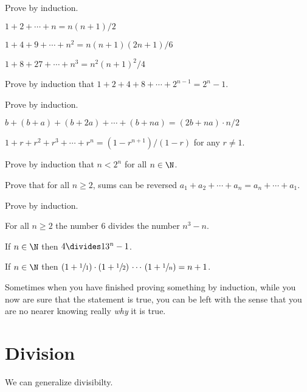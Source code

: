 \documentclass{ibl}
\begin{document}
\begin{ex}
Prove by induction.
\begin{exes}
\item $1+2+\cdots+n=n(n+1)/2$
\item $1+4+9+\cdots+n^2=n(n+1)(2n+1)/6$
\item $1+8+27+\cdots+n^3=n^2(n+1)^2/4$
\end{exes}
\end{ex}

\begin{ex}
Prove by induction that
$1+2+4+8+\cdots+2^{n-1}=2^n-1$.  
\end{ex}

\begin{ex}
Prove by induction.
\begin{exes}
  \item {}
       $b+(b+a)+(b+2a)+\cdots+(b+na)=(2b+na)\cdot n/2$
  \item {}
        $1+r+r^2+r^3+\cdots+r^n=(1-r^{n+1})/(1-r)$ for any $r\neq 1$.
\end{exes}
\end{ex}

\begin{ex}
Prove by induction that $n<2^n$ for all $n\in\N$.  
\end{ex}

\begin{ex}
Prove that for all $n\geq 2$, sums can be reversed
$a_1+a_2+\cdots+a_n=a_n+\cdots+a_1$.   
\end{ex}

\begin{ex}
Prove by induction.
\begin{exes}
\item For all $n\geq 2$ the number $6$ divides the number $n^3-n$.
\item If $n\in\N$ then $4\divides 13^n-1$.
\item If $n\in\N$ then
    $(1+\sfrac{1}{1})\cdot(1+\sfrac{1}{2})\,\cdots\,(1+\sfrac{1}{n})=n+1$.
\end{exes}
\end{ex}

Sometimes when you have finished proving something by induction, 
while you now are sure that the statement is true, 
you can be left with the sense
that you are no nearer knowing really \emph{why} it is true.



\section{Division}
We can generalize divisibilty.
\end{document}
